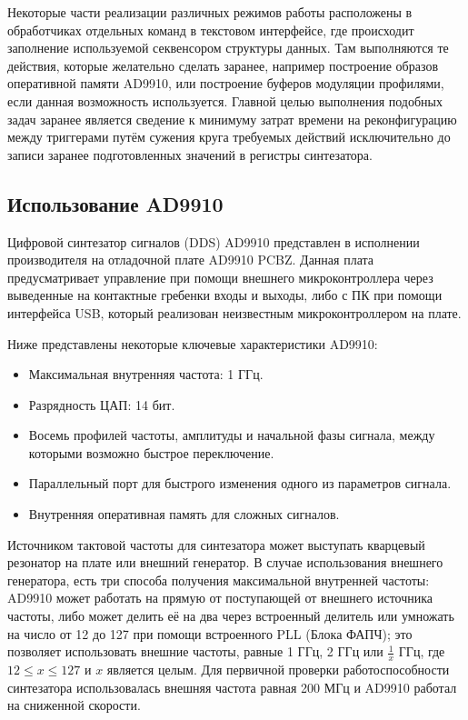 \documentclass[rusmathsym, eqnumwithinsec, amspack, hyperref]{bomgost}
\begin{document}
Некоторые части реализации различных режимов работы расположены в обработчиках отдельных команд в текстовом интерфейсе, где происходит заполнение используемой секвенсором структуры данных. Там выполняются те действия, которые желательно сделать заранее, например построение образов оперативной памяти AD9910, или построение буферов модуляции профилями, если данная возможность используется. Главной целью выполнения подобных задач заранее является сведение к минимуму затрат времени на реконфигурацию между триггерами путём сужения круга требуемых действий исключительно до записи заранее подготовленных значений в регистры синтезатора.

\subsection{Использование AD9910}

Цифровой синтезатор сигналов (DDS) AD9910 представлен в исполнении производителя на отладочной плате AD9910 PCBZ. Данная плата предусматривает управление при помощи внешнего микроконтроллера через выведенные на контактные гребенки входы и выходы, либо с ПК при помощи интерфейса USB, который реализован неизвестным микроконтроллером на плате.

Ниже представлены некоторые ключевые характеристики AD9910:

\begin{itemize}
	\item Максимальная внутренняя частота: 1 ГГц.
	\item Разрядность ЦАП: 14 бит.
	\item Восемь профилей частоты, амплитуды и начальной фазы сигнала, между которыми возможно быстрое переключение.
	\item Параллельный порт для быстрого изменения одного из параметров сигнала.
	\item Внутренняя оперативная память для сложных сигналов.
\end{itemize}

Источником тактовой частоты для синтезатора может выступать кварцевый резонатор на плате или внешний генератор. В случае использования внешнего генератора, есть три способа получения максимальной внутренней частоты: AD9910 может работать на прямую от поступающей от внешнего источника частоты, либо может делить её на два через встроенный делитель или умножать на число от 12 до 127 при помощи встроенного PLL (Блока ФАПЧ); это позволяет использовать внешние частоты, равные 1 ГГц, 2 ГГц или $\frac{1}{x}$ ГГц, где $12 \leq x \leq 127$ и $x$ является целым. Для первичной проверки работоспособности синтезатора использовалась внешняя частота равная 200 МГц и AD9910 работал на сниженной скорости.
\end{document}
